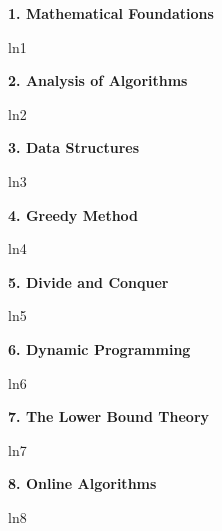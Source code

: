 \documentclass[8pt]{minimal}
\begin{document}
\begin{flushleft}
\begin{multicols}{3}


    \textbf{1. Mathematical Foundations}

    ln1


    \textbf{2. Analysis of Algorithms}

    ln2


    \textbf{3. Data Structures}

    ln3


    \textbf{4. Greedy Method}

    ln4


    \textbf{5. Divide and Conquer}

    ln5


    \textbf{6. Dynamic Programming}

    ln6


    \textbf{7. The Lower Bound Theory}

    ln7


    \textbf{8. Online Algorithms}

    ln8
    

    \lipsum
    \lipsum

\end{multicols}
\end{flushleft}
\end{document}
